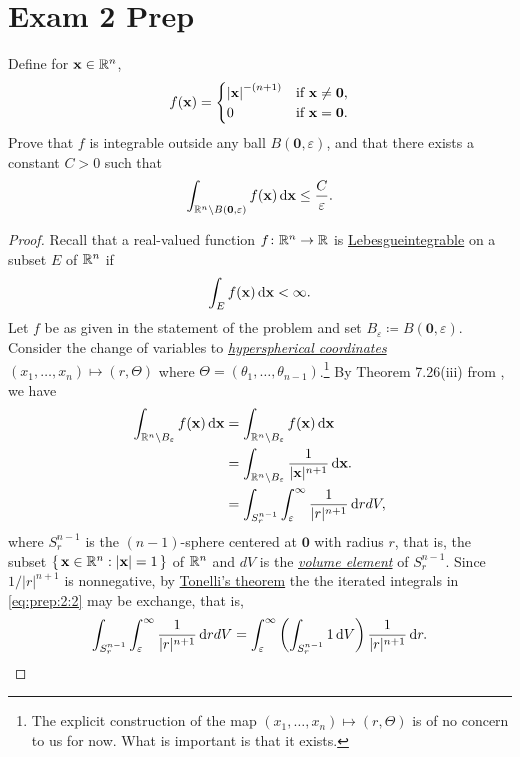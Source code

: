 \section{Exam 2 Prep}
\begin{problem}
Define for $\mathbf{x}\in\mathbb{R}^n$,
\[
f(\mathbf{x})=
\begin{cases}
\left|\mathbf{x}\right|^{-(n+1)}&\text{if $\mathbf{x}\neq \mathbf{0}$,}\\
0&\text{if $\mathbf{x}=\mathbf{0}$.}
\end{cases}
\]
Prove that $f$ is integrable outside any ball $B(\mathbf{0},\varepsilon)$,
and that there exists a constant $C>0$ such that
\[
\int_{\mathbb{R}^n\setminus B(\mathbf{0},\varepsilon)}f(\mathbf{x}) \mathop{}\!\mathrm{d} \mathbf{x}\leq\frac{C}{\varepsilon}.
\]
\end{problem}
\begin{proof}
Recall that a real-valued function $f\colon\mathbb{R}^n\to\mathbb{R}$ is
\href{https://en.wikipedia.org/wiki/Fubini's_theorem#Tonelli.27s_theorem_for_non-negative_functions}{Lebesgueintegrable}
on a subset $E$ of $\mathbb{R}^n$ if
\begin{equation}
\label{eq:prep:2:1}
\int_E f(\mathbf{x})\mathop{}\!\mathrm{d}\mathbf{x}<\infty.
\end{equation}
Let $f$ be as given in the statement of the problem and set
$B_\varepsilon\coloneqq B(\mathbf{0},\varepsilon)$. Consider
the change of variables to
\href{https://en.wikipedia.org/wiki/N-sphere#Spherical_coordinates}{\emph{hyperspherical
    coordinates}} $(x_1,\dotsc,x_n)\mapsto(r,\Theta)$ where
$\Theta=(\theta_1,\dotsc,\theta_{n-1})$.\footnote{The explicit construction
  of the map $(x_1,\dotsc,x_n)\mapsto(r,\Theta)$ is of no concern to us for
  now. What is important is that it exists.} By Theorem 7.26(iii) from
\cite[Ch.\@ 7, p.\@ 123]{rudin-2}, we have
\begin{equation}
\label{eq:prep:2:2}
\begin{aligned}
\int_{\mathbb{R}^n\setminus B_\varepsilon}f(\mathbf{x})\mathop{}\!\mathrm{d}\mathbf{x}
&=\int_{\mathbb{R}^n\setminus B_\varepsilon} f(\mathbf{x})\mathop{}\!\mathrm{d}\mathbf{x}\\
&=\int_{\mathbb{R}^n\setminus
  B_\varepsilon}\frac{1}{|\mathbf{x}|^{n+1}}\mathop{}\!\mathrm{d}\mathbf{x}.\\
&=\int_{S^{n-1}_r}\int_\varepsilon^\infty\frac{1}{|r|^{n+1}} \mathop{}\!\mathrm{d} r dV,
\end{aligned}
\end{equation}
where $S_r^{n-1}$ is the $(n-1)$-sphere centered at $\mathbf{0}$ with
radius $r$, that is, the subset $\left\{\,\mathbf{x}\in\mathbb{R}^n:|\mathbf{x}|=1\,\right\}$
of $\mathbb{R}^n$ and $dV$ is the
\href{https://en.wikipedia.org/wiki/Volume_element}{\emph{volume element}}
of $S_r^{n-1}$. Since $1/|r|^{n+1}$ is nonnegative, by
\href{https://en.wikipedia.org/wiki/Fubini's_theorem#Tonelli.27s_theorem}{Tonelli's
  theorem} the the iterated integrals in \eqref{eq:prep:2:2} may be
exchange, that is,
\begin{equation}
  \label{eq:prep:2:3}
\int_{S^{n-1}_r}\int_\varepsilon^\infty\frac{1}{|r|^{n+1}} \mathop{}\!\mathrm{d} r dV=
\int_\varepsilon^\infty\left(\int_{S_r^{n-1}}1\mathop{}\!\mathrm{d}
  V\right)\frac{1}{|r|^{n+1}}\mathop{}\!\mathrm{d} r.
\end{equation}


\end{proof}
